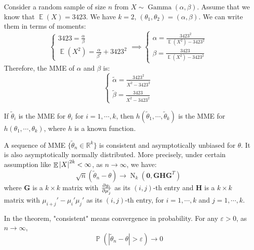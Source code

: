 \documentclass{huhtakm-template-book-v2}
\DeclareMathOperator{\prob}{\mathbb{P}}
\DeclareMathOperator{\E}{\mathbb{E}}
\DeclareMathOperator{\N}{N}
\DeclareMathOperator{\Gam}{Gamma}
\begin{document}
\begin{eg}
	Consider a random sample of size $n$ from $X\sim\Gam(\alpha,\beta)$. Assume that we know that $\E(X)=3423$. We have $k=2$, $(\theta_{1},\theta_{2})=(\alpha,\beta)$. We can write them in terms of moments:
	\begin{equation*}
		\begin{cases}
			3423=\frac{\alpha}{\beta}\\
			\E(X^{2})=\frac{\alpha}{\beta^{2}}+3423^{2}
		\end{cases}\implies\begin{cases}
			\alpha=\frac{3423^{2}}{\E(X^{2})-3423^{2}}\\
			\beta=\frac{3423}{\E(X^{2})-3423^{2}}
		\end{cases}
	\end{equation*}
	Therefore, the MME of $\alpha$ and $\beta$ is:
	\begin{equation*}
		\begin{cases}
			\widetilde{\alpha}=\frac{3423^{2}}{\overline{X^{2}}-3423^{2}}\\
			\widetilde{\beta}=\frac{3423}{\overline{X^{2}}-3423^{2}}
		\end{cases}
	\end{equation*}
\end{eg}
\begin{lem}
	If $\widetilde{\theta}_{i}$ is the MME for $\theta_{i}$ for $i=1,\cdots,k$, then $h(\widetilde{\theta}_{1},\cdots,\widetilde{\theta}_{k})$ is the MME for $h(\theta_{1},\cdots,\theta_{k})$, where $h$ is a known function.
\end{lem}
\begin{thm}
	\label{Chapter 2 (Thoerem) Sequence of MME is asympt. normal}
	A sequence of MME $\{\widetilde{\theta}_{n}\in\mathbb{R}^{k}\}$ is consistent and asymptotically unbiased for $\theta$. It is also asymptotically normally distributed. More precisely, under certain assumption like $\E\abs{X}^{2k}<\infty$, as $n\to\infty$, we have:
	\begin{equation*}
		\sqrt{n}(\widetilde{\theta}_{n}-\theta)\to\N_{k}(\mathbf{0},\mathbf{GHG}^{T})
	\end{equation*}
	where $\mathbf{G}$ is a $k\times k$ matrix with $\pdv{g_{i}}{\mu_{j}'}$ as its $(i,j)$-th entry and $\mathbf{H}$ is a $k\times k$ matrix with $\mu_{i+j}'-\mu_{i}'\mu_{j}'$ as its $(i,j)$-th entry, for $i=1,\cdots,k$ and $j=1,\cdots,k$.
\end{thm}
\begin{rem}
	In the theorem, "consistent" means convergence in probability. For any $\varepsilon>0$, as $n\to\infty$,
	\begin{equation*}
		\prob(|\widetilde{\theta}_{n}-\theta|>\varepsilon)\to 0
	\end{equation*}
\end{rem}
\end{document}
